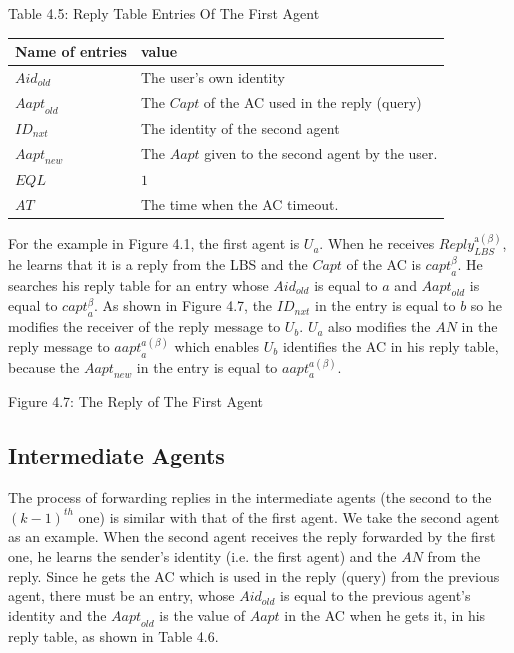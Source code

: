 \noindent 

Table 4.5: Reply Table Entries Of The First Agent

\begin{tabular}{|p{1.0in}|p{2.4in}|} \hline 
Name of entries & value \\ \hline 
${Aid}_{old}$ & The user's own identity \\ \hline 
${Aapt}_{old}$ & The $Capt$ of the AC used in the reply (query) \\ \hline 
${ID}_{nxt}$ & The identity of the second agent \\ \hline 
${Aapt}_{new}$ & The $Aapt$ given to the second agent by the user. \\ \hline 
$EQL$ & $1$ \\ \hline 
$AT$ & The time when the AC timeout. \\ \hline 
\end{tabular}

For the example in Figure 4.1, the first agent is $U_a$. When he receives ${Reply}^{\mathrm{a}\left(\beta\right)}_{LBS}$, he learns that it is a reply from the LBS and the $Capt$ of the AC is ${capt}^{\beta}_a$. He searches his reply table for an entry whose ${Aid}_{old}$ is equal to $a$ and ${Aapt}_{old}$ is equal to ${capt}^{\beta }_a$. As shown in Figure 4.7, the ${ID}_{nxt}$ in the entry is equal to $b$ so he modifies the receiver of the reply message to $U_b$. $U_a$ also modifies the $AN$ in the reply message to ${aapt}^{a\left(\beta\right)}_a$ which enables $U_b$ identifies the AC in his reply table, because the ${Aapt}_{new}$ in the entry is equal to ${aapt}^{a\left(\beta\right)}_a$. 

Figure 4.7: The Reply of The First Agent


\subsection{ Intermediate Agents}

\noindent The process of forwarding replies in the intermediate agents (the second to the ${\left(k-1\right)}^{th}$ one) is similar with that of the first agent. We take the second agent as an example. When the second agent receives the reply forwarded by the first one, he learns the sender's identity (i.e. the first agent) and the $AN$ from the reply. Since he gets the AC which is used in the reply (query) from the previous agent, there must be an entry, whose ${Aid}_{old}$ is equal to the previous agent's identity and the ${Aapt}_{old}$ is the value of $Aapt$ in the AC when he gets it, in his reply table, as shown in Table 4.6.


